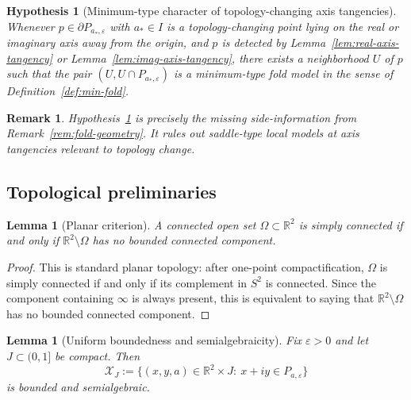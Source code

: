 \documentclass[11pt]{article}
\newtheorem{lemma}[theorem]{Lemma}
\newtheorem{remark}[theorem]{Remark}
\newtheorem{hypothesis}[theorem]{Hypothesis}
\newcommand{\R}{\mathbb{R}}
\begin{document}
\begin{hypothesis}[Minimum-type character of topology-changing axis tangencies]\label{hyp:min-fold}
Whenever \(p\in\partial P_{a_*,\varepsilon}\) with \(a_*\in I\) is a topology-changing point lying on the real or imaginary axis away from the origin, and \(p\) is detected by Lemma~\ref{lem:real-axis-tangency} or Lemma~\ref{lem:imag-axis-tangency}, there exists a neighborhood \(U\) of \(p\) such that the pair \((U,U\cap P_{a_*,\varepsilon})\) is a minimum-type fold model in the sense of Definition~\ref{def:min-fold}.
\end{hypothesis}

\begin{remark}
Hypothesis~\ref{hyp:min-fold} is precisely the missing side-information from Remark~\ref{rem:fold-geometry}. It rules out saddle-type local models at axis tangencies relevant to topology change.
\end{remark}

\subsection*{Topological preliminaries}

\begin{lemma}[Planar criterion]\label{lem:planar-criterion}
A connected open set \(\Omega\subset\R^2\) is simply connected if and only if \(\R^2\setminus\Omega\) has no bounded connected component.
\end{lemma}

\begin{proof}
This is standard planar topology: after one-point compactification, \(\Omega\) is simply connected if and only if its complement in \(S^2\) is connected. Since the component containing \(\infty\) is always present, this is equivalent to saying that \(\R^2\setminus\Omega\) has no bounded connected component.
\end{proof}

\begin{lemma}[Uniform boundedness and semialgebraicity]\label{lem:semialg}
Fix \(\varepsilon>0\) and let \(J\subset (0,1]\) be compact. Then
\[
\mathcal X_J
:=
\{(x,y,a)\in \R^2\times J:\ x+iy\in P_{a,\varepsilon}\}
\]
is bounded and semialgebraic.
\end{lemma}
\end{document}
